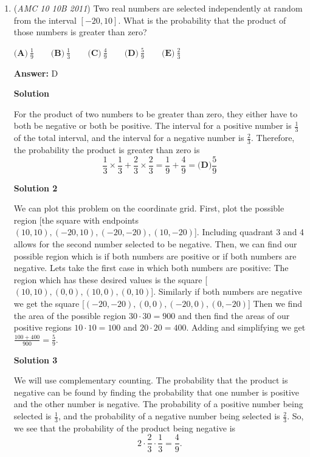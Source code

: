 \begin{enumerate}
	\item (\textit{AMC 10 10B 2011}) Two real numbers are selected independently at random from the interval $[-20, 10]$. What is the probability that the product of those numbers is greater than zero?


 $\textbf{(A)}\ \frac{1}{9} \qquad\textbf{(B)}\ \frac{1}{3} \qquad\textbf{(C)}\ \frac{4}{9} \qquad\textbf{(D)}\ \frac{5}{9} \qquad\textbf{(E)}\ \frac{2}{3}$

 \textbf{Answer: }D



\textbf{Solution}

For the product of two numbers to be greater than zero, they either have to both be negative or both be positive. The interval for a positive number is $\frac{1}{3}$ of the total interval, and the interval for a negative number is $\frac{2}{3}$. Therefore, the probability the product is greater than zero is
 \[\frac{1}{3} \times \frac{1}{3} + \frac{2}{3} \times \frac{2}{3} = \frac{1}{9} + \frac{4}{9} = \boxed{\textbf{(D)} \frac{5}{9}}\]




\textbf{Solution 2}

We can plot this problem on the coordinate grid. First, plot the possible region [the square with endpoints $(10,10), (-20, 10), (-20, -20), (10, -20)$]. Including quadrant 3 and 4 allows for the second number selected to be negative. Then, we can find our possible region which is if both numbers are positive or if both numbers are negative. Lets take the first case in which both numbers are positive: The region which has these desired values is the square [$(10,10) ,(0,0) ,(10,0) ,(0,10)$]. Similarly if both numbers are negative we get the square [$(-20,-20), (0,0), (-20,0) ,(0,-20)$] Then we find the area of the possible region $30\cdot 30 = 900$ and then find the areas of our positive regions $10\cdot 10=100$  and $20\cdot 20 = 400$. Adding and simplifying we get $\frac{100+400}{900}=\frac{5}{9}$.

 



\textbf{Solution 3}

We will use complementary counting. The probability that the product is negative can be found by finding the probability that one number is positive and the other number is negative. The probability of a positive number being selected is $\frac13$, and the probability of a negative number being selected is $\frac23$. So, we see that the probability of the product being negative is
 \[2 \cdot \frac23 \cdot \frac13 = \frac49.\]


\end{enumerate}
